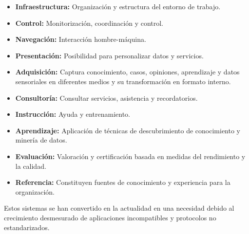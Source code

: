 \begin{itemize}
\item \textbf{Infraestructura:} Organización y estructura del entorno de trabajo. 
\item \textbf{Control:} Monitorización, coordinación y control.
\item \textbf{Navegación:} Interacción hombre-máquina.
\item \textbf{Presentación:} Posibilidad para personalizar datos y servicios.
\item \textbf{Adquisición:} Captura conocimiento, casos, opiniones, aprendizaje y datos sensoriales en diferentes medios y su transformación en formato interno.
\item \textbf{Consultoría:} Consultar servicios, asistencia y recordatorios.
\item \textbf{Instrucción:} Ayuda y entrenamiento.
\item \textbf{Aprendizaje:} Aplicación de técnicas de descubrimiento de conocimiento y minería de datos.
\item \textbf{Evaluación:} Valoración y certificación basada en medidas del rendimiento y la calidad.
\item \textbf{Referencia:} Constituyen fuentes de conocimiento y experiencia para la organización.
\end{itemize}

Estos sistemas se han convertido en la actualidad en una necesidad debido al crecimiento desmesurado de aplicaciones incompatibles y protocolos no estandarizados. 